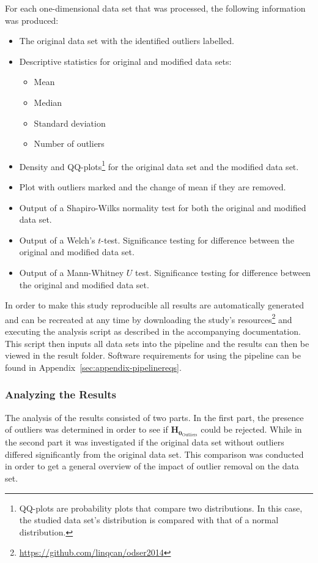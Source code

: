 For each one-dimensional data set that was processed, the following information was produced:
\begin{itemize}
        \item The original data set with the identified outliers labelled.
        \item Descriptive statistics for original and modified data sets:
        \begin{itemize}
                \item Mean
                \item Median
                \item Standard deviation
                \item Number of outliers
        \end{itemize}
        \item Density and QQ-plots\footnote{QQ-plots are probability plots that compare two distributions. In this case, the studied data set's distribution is compared with that of a normal distribution.} for the original data set and the modified data set.
        \item Plot with outliers marked and the change of mean if they are removed.
        \item Output of a Shapiro-Wilks normality test for both the original and modified data set.
        \item Output of a Welch's $t$-test. Significance testing for difference between the original and modified data set.
        \item Output of a Mann-Whitney $U$ test. Significance testing for difference between the original and modified data set.
\end{itemize}




In order to make this study reproducible all results are automatically generated and can be recreated at any time by downloading the study's resources\footnote{\url{https://github.com/linqcan/odser2014}} and executing the analysis script as described in the accompanying documentation. This script then inputs all data sets into the pipeline and the results can then be viewed in the result folder. Software requirements for using the pipeline can be found in Appendix~\ref{sec:appendix-pipelinereqs}.




\subsubsection{Analyzing the Results}
\label{sec:method-appalgo-analysis}
The analysis of the results consisted of two parts. In the first part, the presence of outliers was determined in order to see if $\mathbf{H_{0_{\mathrm{Outliers}}}}$ could be rejected. While in the second part it was investigated if the original data set without outliers differed significantly from the original data set. This comparison was conducted in order to get a general overview of the impact of outlier removal on the data set.




